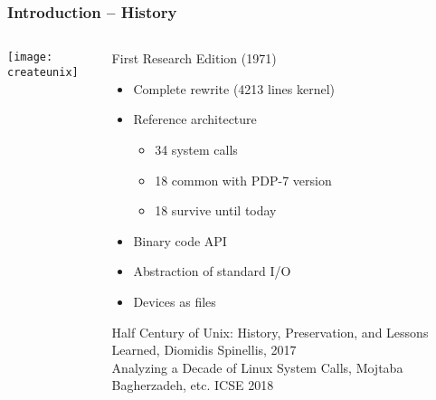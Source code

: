 \begin{frame}[plain]
	\frametitle{Introduction -- History}
	
	
	
	\begin{columns}
		
		\begin{column}{.4\textwidth}
			
			\texttt{[image: createunix]}
			
		\end{column}
		
		\begin{column}{.6\textwidth}

		First Research Edition (1971)
		\begin{itemize}
			\item Complete rewrite (4213 lines kernel)
			\item Reference architecture
			
			\begin{itemize}
				\item 34 system calls
				\item 18 common with PDP-7 version
				\item 18 survive until today				
			\end{itemize}
			
			\item Binary code API
			\item Abstraction of standard I/O
			\item Devices as files
			
		\end{itemize}

	\begin{flushleft}
	\tiny Half Century of Unix:	History, Preservation, and	Lessons Learned, Diomidis Spinellis, 2017
	\\
	Analyzing a Decade of Linux System Calls, Mojtaba Bagherzadeh, etc. ICSE 2018
	
	
\end{flushleft}

		\end{column}
		
		
	\end{columns}
	

	
	
	
	
\end{frame}



